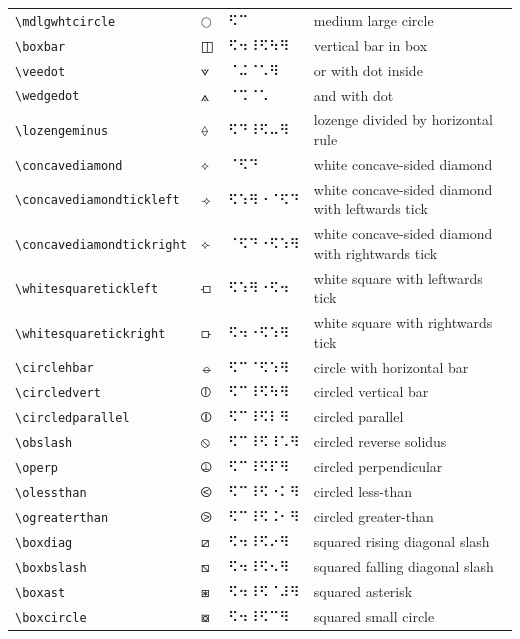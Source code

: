 \documentclass[oneside]{article}
\begin{document}
\begin{longtable}{llll}
\verb|\mdlgwhtcircle| & $\mdlgwhtcircle$ &  ⠫⠉  & {medium large circle} \\[2ex]
\verb|\boxbar| & $\boxbar$ &  ⠫⠲⠸⠫⠳⠻  & {vertical bar in box} \\[2ex]
\verb|\veedot| & $\veedot$ &  ⠈⠬⠈⠡⠻  & {or with dot inside} \\[2ex]
\verb|\wedgedot| & $\wedgedot$ &  ⠈⠩⠈⠡  & {and with dot} \\[2ex]
\verb|\lozengeminus| & $\lozengeminus$ &  ⠫⠙⠸⠫⠤⠻  & {lozenge divided by horizontal rule} \\[2ex]
\verb|\concavediamond| & $\concavediamond$ &  ⠈⠫⠙  & {white concave-sided diamond} \\[2ex]
\verb|\concavediamondtickleft| & $\concavediamondtickleft$ &  ⠫⠱⠻⠐⠈⠫⠙  & {white concave-sided diamond with leftwards tick} \\[2ex]
\verb|\concavediamondtickright| & $\concavediamondtickright$ &  ⠈⠫⠙⠐⠫⠱⠻  & {white concave-sided diamond with rightwards tick} \\[2ex]
\verb|\whitesquaretickleft| & $\whitesquaretickleft$ &  ⠫⠱⠻⠐⠫⠲  & {white square with leftwards tick} \\[2ex]
\verb|\whitesquaretickright| & $\whitesquaretickright$ &  ⠫⠲⠐⠫⠱⠻  & {white square with rightwards tick} \\[2ex]
\verb|\circlehbar| & $\circlehbar$ &  ⠫⠉⠈⠫⠱⠻  & {circle with horizontal bar} \\[2ex]
\verb|\circledvert| & $\circledvert$ &  ⠫⠉⠸⠫⠳⠻  & {circled vertical bar} \\[2ex]
\verb|\circledparallel| & $\circledparallel$ &  ⠫⠉⠸⠫⠇⠻  & {circled parallel} \\[2ex]
\verb|\obslash| & $\obslash$ &  ⠫⠉⠸⠫⠸⠡⠻  & {circled reverse solidus} \\[2ex]
\verb|\operp| & $\operp$ &  ⠫⠉⠸⠫⠏⠻  & {circled perpendicular} \\[2ex]
\verb|\olessthan| & $\olessthan$ &  ⠫⠉⠸⠫⠐⠅⠻  & {circled less-than} \\[2ex]
\verb|\ogreaterthan| & $\ogreaterthan$ &  ⠫⠉⠸⠫⠨⠂⠻  & {circled greater-than} \\[2ex]
\verb|\boxdiag| & $\boxdiag$ &  ⠫⠲⠸⠫⠔⠻  & {squared rising diagonal slash} \\[2ex]
\verb|\boxbslash| & $\boxbslash$ &  ⠫⠲⠸⠫⠢⠻  & {squared falling diagonal slash} \\[2ex]
\verb|\boxast| & $\boxast$ &  ⠫⠲⠸⠫⠈⠼⠻  & {squared asterisk} \\[2ex]
\verb|\boxcircle| & $\boxcircle$ &  ⠫⠲⠸⠫⠉⠻  & {squared small circle} \\[2ex]

\end{longtable}
\end{document}
